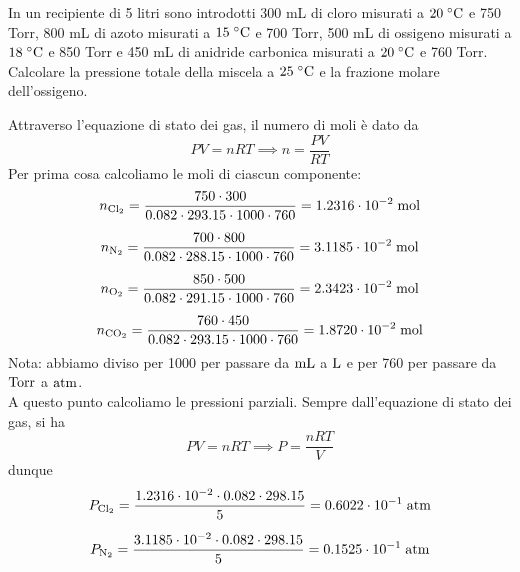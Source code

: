 \begin{esercizio}
    In un recipiente di 5 litri sono introdotti 300 mL di cloro misurati a $20 \; ^{\circ} \rm C$ e 750 Torr, 800 mL di azoto misurati a $15 \; ^{\circ} \rm C$ e 700 Torr, 500 mL di ossigeno misurati a $18 \; ^{\circ} \rm C$ e 850 Torr e 450 mL di anidride carbonica misurati a $20 \; ^{\circ} \rm C$ e 760 Torr. Calcolare la pressione totale della miscela a $25 \; ^{\circ} \rm C$ e la frazione molare dell'ossigeno.
\end{esercizio}
\begin{soluzione}
    Attraverso l'equazione di stato dei gas, il numero di moli è dato da
    \begin{equation*}
        PV=nRT
        \implies
        n=\frac{PV}{RT}
    \end{equation*}
    Per prima cosa calcoliamo le moli di ciascun componente:
    \begin{gather*}
        n_{\rm Cl_2}
        =\frac{750 \cdot 300}{0.082 \cdot 293.15 \cdot 1000 \cdot 760}
        =1.2316 \cdot 10^{-2} \; \rm mol
        \\[0.2cm]
        n_{\rm N_2}
        =\frac{700 \cdot 800}{0.082 \cdot 288.15 \cdot 1000 \cdot 760}
        =3.1185 \cdot 10^{-2} \; \rm mol
        \\[0.2cm]
        n_{\rm O_2}
        =\frac{850 \cdot 500}{0.082 \cdot 291.15 \cdot 1000 \cdot 760}
        =2.3423 \cdot 10^{-2} \; \rm mol
        \\[0.2cm]
        n_{\rm CO_2}
        =\frac{760 \cdot 450}{0.082 \cdot 293.15 \cdot 1000 \cdot 760}
        =1.8720 \cdot 10^{-2} \; \rm mol
    \end{gather*}
    Nota: abbiamo diviso per 1000 per passare da $\rm mL$ a $\rm L$ e per 760 per passare da $\rm Torr$ a $\rm atm$.\\
    A questo punto calcoliamo le pressioni parziali. Sempre dall'equazione di stato dei gas, si ha
    \begin{equation*}
        PV=nRT
        \implies
        P=\frac{nRT}{V}
    \end{equation*}
    dunque
    \begin{gather*}
        P_{\rm Cl_2}
        =\frac{1.2316 \cdot 10^{-2} \cdot 0.082 \cdot 298.15}{5}
        =0.6022 \cdot 10^{-1} \; \rm atm
        \\[0.2cm]
        P_{\rm N_2}
        =\frac{3.1185 \cdot 10^{-2} \cdot 0.082 \cdot 298.15}{5}
        =0.1525 \cdot 10^{-1} \; \rm atm
        \\[0.2cm]

\end{gather*}
\end{soluzione}
